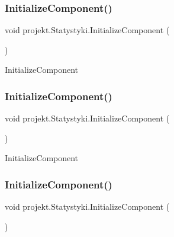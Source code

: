 \subsubsection{\texorpdfstring{Initialize\+Component()}{InitializeComponent()}\hspace{0.1cm}{\footnotesize\ttfamily [6/9]}}
{\footnotesize\ttfamily void projekt.\+Statystyki.\+Initialize\+Component (\begin{DoxyParamCaption}{ }\end{DoxyParamCaption})\hspace{0.3cm}{\ttfamily [inline]}}



Initialize\+Component 

\mbox{\label{classprojekt_1_1_statystyki_a6f4801d8176e1c715f5260bf055b0915}} 
\subsubsection{\texorpdfstring{Initialize\+Component()}{InitializeComponent()}\hspace{0.1cm}{\footnotesize\ttfamily [7/9]}}
{\footnotesize\ttfamily void projekt.\+Statystyki.\+Initialize\+Component (\begin{DoxyParamCaption}{ }\end{DoxyParamCaption})\hspace{0.3cm}{\ttfamily [inline]}}



Initialize\+Component 

\mbox{\label{classprojekt_1_1_statystyki_a6f4801d8176e1c715f5260bf055b0915}} 
\subsubsection{\texorpdfstring{Initialize\+Component()}{InitializeComponent()}\hspace{0.1cm}{\footnotesize\ttfamily [8/9]}}
{\footnotesize\ttfamily void projekt.\+Statystyki.\+Initialize\+Component (\begin{DoxyParamCaption}{ }\end{DoxyParamCaption})\hspace{0.3cm}{\ttfamily [inline]}}



